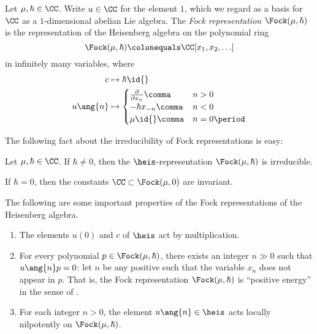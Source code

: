 \begin{definition}
	Let $ \mu, \hbar \in \CC $.
	Write $ u \in \CC $ for the element $ 1 $, which we regard as a basis for $ \CC $ as a $ 1 $-dimensional abelian Lie algebra.
	The \textit{Fock representation} $ \Fock(\mu,\hbar) $ is the representation of the Heisenberg algebra on the
	polynomial ring
	\begin{equation*}
		\Fock(\mu,\hbar) \colonequals \CC[x_1,x_2,\ldots]
	\end{equation*}
	in infinitely many variables, where
	\begin{align*}
		c &\mapsto \hbar \id{} \\ 
		u\ang{n} &\mapsto \begin{cases}
			\frac{\partial}{\partial x_n} \comma & n > 0 \\
			-\hbar x_{-n} \comma & n < 0 \\ 
			\mu \id{} \comma & n = 0 \period
		\end{cases} \\
	\end{align*}
\end{definition}

The following fact about the irreducibility of Fock representations is easy:

\begin{lemma}[{\cite[Lemma 2.1]{MR1021978}}]
	Let $ \mu,\hbar \in \CC $.
	If $ \hbar \neq 0 $, then the $ \heis $-representation $ \Fock(\mu,\hbar) $ is irreducible.
\end{lemma}

\begin{nul}
	If $ \hbar = 0 $, then the constants $ \CC \subset \Fock(\mu,0) $ are invariant.
\end{nul}

\begin{properties}\label{properties:Fock}
	The following are some important properties of the Fock representations of the Heisenberg algebra.
	\begin{enumerate}
		\item\label{properties:Fock.1} The elements $ u(0) $ and $ c $ of $ \heis $ act by multiplication.

		\item\label{properties:Fock.2} For every polynomial $ p \in \Fock(\mu,\hbar) $, there exists an integer $ n \gg 0 $ such that $ u\ang{n} p = 0 $: let $ n $ be any positive such that the variable $ x_n $ does not appear in $ p $.
		That is, the Fock representation $ \Fock(\mu,\hbar) $ is ``positive energy'' in the sense of .

		\item\label{properties:Fock.3} For each integer $ n > 0 $, the element $ u\ang{n} \in \heis $ acts locally nilpotently on $ \Fock(\mu,\hbar) $.
	\end{enumerate}
\end{properties}

